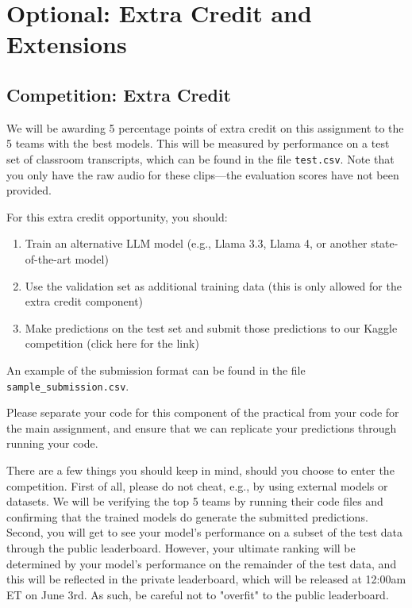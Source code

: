 \documentclass[11pt]{article}
\begin{document}
\section{Optional: Extra Credit and Extensions}

\subsection{Competition: Extra Credit}

We will be awarding 5 percentage points of extra credit on this assignment to the 5 teams with the best models. This will be measured by performance on a test set of classroom transcripts, which can be found in the file \texttt{test.csv}. Note that you only have the raw audio for these clips—the evaluation scores have not been provided. 

For this extra credit opportunity, you should:

\begin{enumerate}
    \item Train an alternative LLM model (e.g., Llama 3.3, Llama 4, or another state-of-the-art model)
    \item Use the validation set as additional training data (this is only allowed for the extra credit component)
    \item Make predictions on the test set and submit those predictions to our Kaggle competition (click here for the link)
\end{enumerate}

An example of the submission format can be found in the file \texttt{sample\_submission.csv}.

Please separate your code for this component of the practical from your code for the main assignment, and ensure that we can replicate your predictions through running your code.

There are a few things you should keep in mind, should you choose to enter the competition. First of all, please do not cheat, e.g., by using external models or datasets. We will be verifying the top 5 teams by running their code files and confirming that the trained models do generate the submitted predictions. Second, you will get to see your model's performance on a subset of the test data through the public leaderboard. However, your ultimate ranking will be determined by your model's performance on the remainder of the test data, and this will be reflected in the private leaderboard, which will be released at 12:00am ET on June 3rd. As such, be careful not to "overfit" to the public leaderboard.
\end{document}
